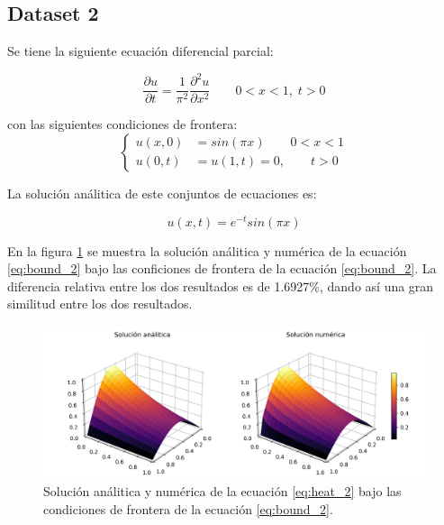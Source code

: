 \subsection{Dataset 2}

Se tiene la siguiente ecuación diferencial parcial:

\begin{equation}
    \frac{\partial u}{\partial t} = \frac{1}{\pi^2}\frac{\partial^2 u}{\partial x^2} \qquad 0<x<1, \; t>0 \label{eq:heat_2}
\end{equation}

con las siguientes condiciones de frontera:
\begin{equation}
    \begin{cases}
        u(x,0) & = sin(\pi x) \qquad 0<x<1 \\
        u(0,t) & =u(1,t) = 0, \qquad t>0
    \end{cases} \label{eq:bound_2}
\end{equation}

La solución análitica de este conjuntos de ecuaciones es:

\begin{equation}
    u(x,t)= e^{-t}sin(\pi x) \label{eq:sol_2}
\end{equation}

En la figura \ref{fig:sol_2} se muestra la solución análitica y numérica de la ecuación \ref{eq:bound_2} bajo las conficiones de frontera de la ecuación \ref{eq:bound_2}. La diferencia relativa entre los dos resultados es de 1.6927\%, dando así una gran similitud entre los dos resultados.

\begin{figure}[H]
    \centering
    \includegraphics[width=16cm]{Graphics/surface_2.png}
    \caption{Solución análitica y numérica de la ecuación \ref{eq:heat_2} bajo las condiciones de frontera de la ecuación \ref{eq:bound_2}.}
    \label{fig:sol_2}
\end{figure}

